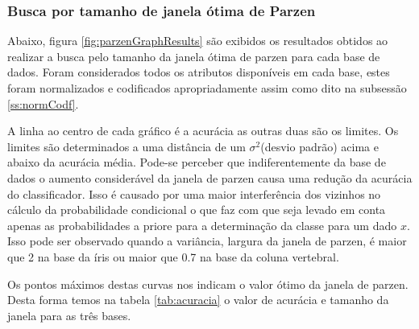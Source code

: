 \documentclass[ 
	article,			%
	11pt,				%
	oneside,			%
	a4paper,			%
	english,			%
	brazil,				%
	]{abntex2}
\begin{document}
\subsubsection{Busca por tamanho de janela ótima de Parzen}
\label{sss:OptSizWindSearc}

Abaixo, figura \ref{fig:parzenGraphResults} são exibidos os resultados obtidos
ao realizar a busca pelo tamanho da janela ótima de parzen para cada base de dados.
Foram considerados todos os atributos disponíveis em cada base, estes
foram normalizados e codificados apropriadamente assim como dito na
subsessão \ref{ss:normCodf}.


A linha ao centro de cada gráfico é a acurácia as outras duas são os limites.
Os limites são determinados a uma distância de um $\sigma^2$(desvio padrão)
acima e abaixo da acurácia média. Pode-se perceber que indiferentemente da base
de dados o aumento considerável da janela de parzen causa uma redução da
acurácia do classificador. Isso é causado por uma maior interferência dos vizinhos no
cálculo da probabilidade condicional o que faz com que seja levado em conta
apenas as probabilidades a priore para a determinação da classe para um dado
$x$. Isso pode ser observado quando a variância, largura da janela de parzen, é
maior que 2 na base da íris ou maior que 0.7 na base da coluna vertebral.

Os pontos máximos destas curvas nos indicam o valor ótimo da janela de parzen.
Desta forma temos na tabela \ref{tab:acuracia} o valor de acurácia e tamanho da
janela para as três bases.



% 
% 
% 
\end{document}
